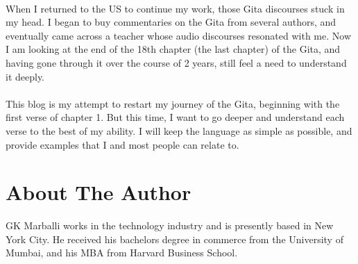 \documentclass[a5paper,9pt,openany]{memoir}
\begin{document}
~\\When I returned to the US to continue my work, those Gita discourses stuck in my head. I began to buy commentaries on the Gita from several authors, and eventually came across a teacher whose audio discourses resonated with me. Now I am looking at the end of the 18th chapter (the last chapter) of the Gita, and having gone through it over the course of 2 years, still feel a need to understand it deeply.\\

~\\This blog is my attempt to restart my journey of the Gita, beginning with the first verse of chapter 1. But this time, I want to go deeper and understand each verse to the best of my ability. I will keep the language as simple as possible, and provide examples that I and most people can relate to.\\

\chapter*{About The Author}

GK Marballi works in the technology industry and is presently based in New York City. He received his bachelors degree in commerce from the University of Mumbai, and his MBA from Harvard Business School.\\
\end{document}
